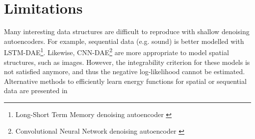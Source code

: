 
\section{Limitations}

Many interesting data structures are difficult to reproduce with shallow denoising autoencoders. For example, sequential data (e.g. sound) is better modelled with LSTM-DAE\footnote{Long-Short Term Memory denoising autoencoder \citep{lstm-dae}}. Likewise, CNN-DAE\footnote{Convolutional Neural Network denoising autoencoder \citep{cnn-dae}} are more appropriate to model spatial structures, such as images. However, the integrability criterion for these models is not satisfied anymore, and thus the negative log-likelihood cannot be estimated. Alternative methods to efficiently learn energy functions for spatial or sequential data are presented in \citep{anomaly-detection-energy, energy-estimation}
